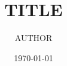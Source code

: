 \documentclass[12pt]{article}
\title{TITLE}
\author{AUTHOR}
\date{\today}
\begin{document}
\maketitle

\begin{abstract}

\end{abstract}











\appendix

\end{document}

